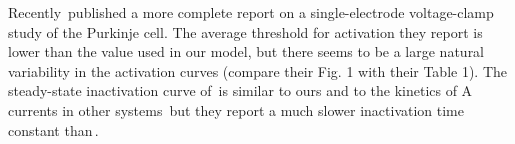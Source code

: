 \documentclass[12pt]{article}
\begin{document}
Recently\,\cite{Wang:1991bs} published a more complete report on a single-electrode voltage-clamp study of the Purkinje cell. The average threshold for activation they report is lower than the value used in our model, but there seems to be a large natural variability in the activation curves (compare their Fig. 1 with their Table 1). The steady-state inactivation curve of\,\cite{Wang:1991bs} is similar to ours and to the kinetics of A currents in other systems\,\cite{Connor:1971tg, Rogawski:1985fv} but they report a much slower inactivation time constant than\,\cite{Hirano:1989uq}.



\end{document}
